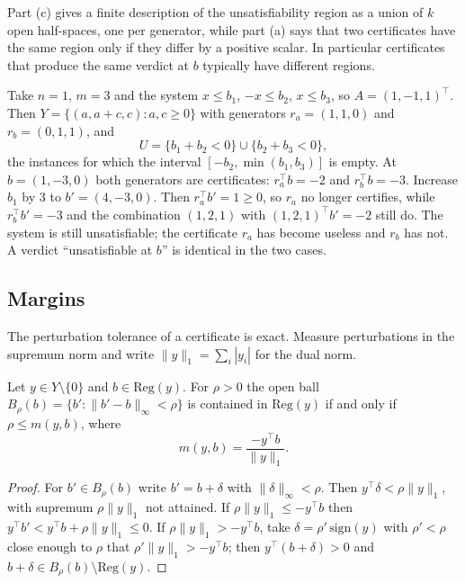 Part (c) gives a finite description of the unsatisfiability region as a union of $k$ open half-spaces, one per generator, while part (a) says that two certificates have the same region only if they differ by a positive scalar. In particular certificates that produce the same verdict at $b$ typically have different regions.

\begin{example}
\label{ex:farkas-stab}
Take $n=1$, $m=3$ and the system $x\le b_1$, $-x\le b_2$, $x\le b_3$, so $A=(1,-1,1)^{\top}$. Then $Y=\{(a,a+c,c):a,c\ge0\}$ with generators $r_a=(1,1,0)$ and $r_b=(0,1,1)$, and
\[
U=\{b_1+b_2<0\}\cup\{b_2+b_3<0\},
\]
the instances for which the interval $[-b_2,\min(b_1,b_3)]$ is empty. At $b=(1,-3,0)$ both generators are certificates: $r_a^{\top}b=-2$ and $r_b^{\top}b=-3$. Increase $b_1$ by $3$ to $b'=(4,-3,0)$. Then $r_a^{\top}b'=1\ge0$, so $r_a$ no longer certifies, while $r_b^{\top}b'=-3$ and the combination $(1,2,1)$ with $(1,2,1)^{\top}b'=-2$ still do. The system is still unsatisfiable; the certificate $r_a$ has become useless and $r_b$ has not. A verdict ``unsatisfiable at $b$'' is identical in the two cases.
\end{example}

\subsection*{Margins}

The perturbation tolerance of a certificate is exact. Measure perturbations in the supremum norm and write $\|y\|_1=\sum_i|y_i|$ for the dual norm.

\begin{proposition}
\label{prop:margin}
Let $y\in Y\setminus\{0\}$ and $b\in\mathrm{Reg}(y)$. For $\rho>0$ the open ball $B_\rho(b)=\{b':\|b'-b\|_\infty<\rho\}$ is contained in $\mathrm{Reg}(y)$ if and only if $\rho\le m(y,b)$, where
\[
m(y,b)=\frac{-y^{\top}b}{\|y\|_1}.
\]
\end{proposition}

\begin{proof}
For $b'\in B_\rho(b)$ write $b'=b+\delta$ with $\|\delta\|_\infty<\rho$. Then $y^{\top}\delta<\rho\|y\|_1$, with supremum $\rho\|y\|_1$ not attained. If $\rho\|y\|_1\le-y^{\top}b$ then $y^{\top}b'<y^{\top}b+\rho\|y\|_1\le0$. If $\rho\|y\|_1>-y^{\top}b$, take $\delta=\rho'\,\mathrm{sign}(y)$ with $\rho'<\rho$ close enough to $\rho$ that $\rho'\|y\|_1>-y^{\top}b$; then $y^{\top}(b+\delta)>0$ and $b+\delta\in B_\rho(b)\setminus\mathrm{Reg}(y)$.
\end{proof}

